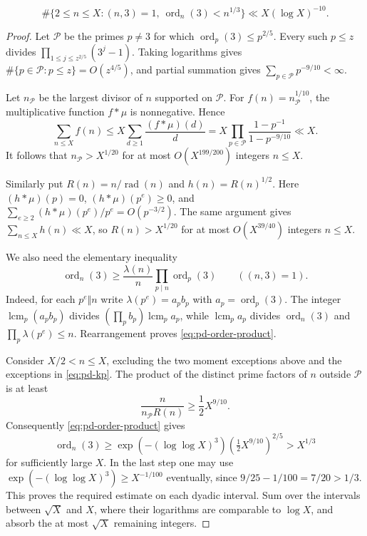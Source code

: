 \begin{lemma}\label{lem:pd-small-order}
\[
 \#\{2\leq n\leq X:(n,3)=1,\ \operatorname{ord}_n(3)<n^{1/3}\}
       \ll X(\log X)^{-10}.
\]
\end{lemma}
\begin{proof}
Let $\mathscr P$ be the primes $p\ne3$ for which
$\operatorname{ord}_p(3)\leq p^{2/5}$. Every such $p\leq z$ divides
$\prod_{1\leq j\leq z^{2/5}}(3^j-1)$. Taking logarithms gives
$\#\{p\in\mathscr P:p\leq z\}=O(z^{4/5})$, and partial summation
gives $\sum_{p\in\mathscr P}p^{-9/10}<\infty$.

Let $n_{\mathscr P}$ be the largest divisor of $n$ supported on
$\mathscr P$. For $f(n)=n_{\mathscr P}^{1/10}$, the multiplicative
function $f*\mu$ is nonnegative. Hence
\[
 \sum_{n\leq X} f(n)
 \leq X\sum_{d\geq1}\frac{(f*\mu)(d)}d
 =X\prod_{p\in\mathscr P}\frac{1-p^{-1}}{1-p^{-9/10}}
 \ll X.
\]
It follows that $n_{\mathscr P}>X^{1/20}$ for at most $O(X^{199/200})$
integers $n\leq X$.

Similarly put $R(n)=n/\operatorname{rad}(n)$ and $h(n)=R(n)^{1/2}$.
Here $(h*\mu)(p)=0$, $(h*\mu)(p^e)\geq0$, and
$\sum_{e\geq2}(h*\mu)(p^e)/p^e=O(p^{-3/2})$.
The same argument gives $\sum_{n\leq X}h(n)\ll X$, so
$R(n)>X^{1/20}$ for at most $O(X^{39/40})$ integers $n\leq X$.

We also need the elementary inequality
\begin{equation}\label{eq:pd-order-product}
 \operatorname{ord}_n(3)\geq
       \frac{\lambda(n)}n\prod_{p\mid n}\operatorname{ord}_p(3)
       \qquad ((n,3)=1).
\end{equation}
Indeed, for each $p^e\Vert n$ write
$\lambda(p^e)=a_pb_p$ with $a_p=\operatorname{ord}_p(3)$.
The integer $\operatorname{lcm}_p(a_pb_p)$ divides
$(\prod_p b_p)\operatorname{lcm}_p a_p$, while
$\operatorname{lcm}_p a_p$ divides $\operatorname{ord}_n(3)$ and
$\prod_p\lambda(p^e)\leq n$. Rearrangement proves
\eqref{eq:pd-order-product}.

Consider $X/2<n\leq X$, excluding the two moment exceptions above
and the exceptions in \eqref{eq:pd-kp}. The product of the distinct
prime factors of $n$ outside $\mathscr P$ is at least
\[
 \frac{n}{n_{\mathscr P}R(n)}\geq\frac12X^{9/10}.
\]
Consequently \eqref{eq:pd-order-product} gives
\[
 \operatorname{ord}_n(3)
 \geq\exp(- (\log\log X)^3)
                       \left(\tfrac12X^{9/10}\right)^{2/5}
 >X^{1/3}
\]
for sufficiently large $X$. In the last step one may use
$\exp(- (\log\log X)^3)\geq X^{-1/100}$ eventually, since
$9/25-1/100=7/20>1/3$. This proves the required estimate on each
dyadic interval. Sum over the intervals between $\sqrt X$ and $X$,
where their logarithms are comparable to $\log X$, and absorb the
at most $\sqrt X$ remaining integers.
\end{proof}

